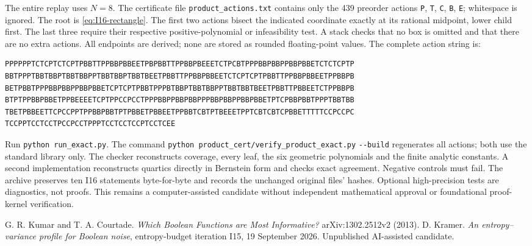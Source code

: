 \documentclass[11pt]{article}
\theoremstyle{remark}\newtheorem{remark}[theorem]{Remark}
\numberwithin{equation}{section}
\begin{document}
The entire replay uses $N=8$. The certificate file
\texttt{product\_actions.txt} contains only the 439 preorder actions
\texttt{P}, \texttt{T}, \texttt{C}, \texttt{B}, \texttt{E}; whitespace is ignored.
The root is \eqref{eq:I16-rectangle}. The first two actions bisect the indicated
coordinate exactly at its rational midpoint, lower child first. The last three
require their respective positive-polynomial or infeasibility test. A stack
checks that no box is omitted and that there are no extra actions.
All endpoints are derived; none are stored as rounded floating-point values.
The complete action string is:
\begin{center}\begin{minipage}{0.97\textwidth}\small
\begin{verbatim}
PPPPPPTCTCPTCTCPTPBBTTPPBBPBBEETPBPBBTTPPBBPBEEETCTPCBTPPPBBPBBPPBBPBBETCTCTCPTP
BBTPPPTBBTBBPTBBTBBPPTBBTBBPTBBTBEETPBBTTPPBBPBBEETCTCPTCPTPBBTTPPBBPBBEETPPBBPB
BETPBBTPPPBBPBBPPBBPBBETCPTCPTPBBTPPPBTBBPTBBTBBPPTBBTBBTBEETPBBTTPBBEETCTPPBBPB
BTPTPPBBPBBETPPBEEEETCPTPPCCPCCTPPPBBPPBBPBBPPPBBPBBPPBBPBBETPTCPBBPBBTPPPTBBTBB
TBETPBBEETTCPCCPPTPPBBPBBTPTPBBETPBBEETPPBBTCBTPTBEEETPPTCBTCBTCPBBETTTTTCCPCCPC
TCCPPTCCTCCTPCCPCCTPPPTCCTCCTCCPTCCTCEE
\end{verbatim}
\end{minipage}\end{center}
Run \texttt{python run\_exact.py}. The command
\texttt{python product\_cert/verify\_product\_exact.py} \verb|--build| regenerates
all actions; both use the standard library only. The checker reconstructs
coverage, every leaf, the six geometric polynomials and the finite analytic
constants. A second implementation reconstructs quartics directly in Bernstein
form and checks exact agreement. Negative controls must fail. The archive
preserves ten I16 statements byte-for-byte and records the unchanged original
files' hashes. Optional high-precision tests are diagnostics, not proofs.
This remains a computer-assisted candidate without independent mathematical
approval or foundational proof-kernel verification.

\begin{thebibliography}{9}
 G. R. Kumar and T. A. Courtade.
\emph{Which Boolean Functions are Most Informative?}
arXiv:1302.2512v2 (2013).
 D. Kramer.
\emph{An entropy--variance profile for Boolean noise}, entropy-budget
iteration I15, 19 September 2026. Unpublished AI-assisted candidate.
\end{thebibliography}
\end{document}
